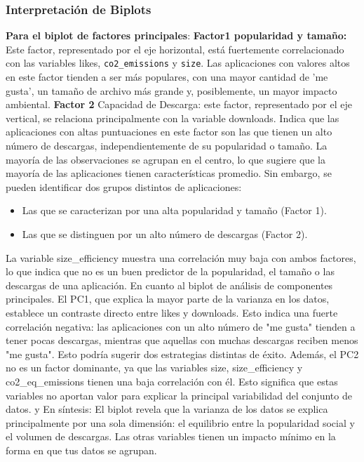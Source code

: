 \documentclass[journal]{IEEEtran}
\begin{document}
	\subsubsection{Interpretación de Biplots}
	\textbf{Para el biplot de factores principales}: \textbf{Factor1 popularidad y tamaño:} Este factor, representado por el eje horizontal, está fuertemente correlacionado con las variables likes, \texttt{co2\_emissions} y \texttt{size}. Las aplicaciones con valores altos en este factor tienden a ser más populares, con una mayor cantidad de 'me gusta', un tamaño de archivo más grande y, posiblemente, un mayor impacto ambiental.
	\textbf{Factor 2} Capacidad de Descarga: este factor, representado por el eje vertical, se relaciona principalmente con la variable downloads. Indica que las aplicaciones con altas puntuaciones en este factor son las que tienen un alto número de descargas, independientemente de su popularidad o tamaño.
	La mayoría de las observaciones se agrupan en el centro, lo que sugiere que la mayoría de las aplicaciones tienen características promedio. Sin embargo, se pueden identificar dos grupos distintos de aplicaciones:
	\begin{itemize}
		\item Las que se caracterizan por una alta popularidad y tamaño (Factor 1).
		\item Las que se distinguen por un alto número de descargas (Factor 2).
	\end{itemize}
	La variable size\_efficiency muestra una correlación muy baja con ambos factores, lo que indica que no es un buen predictor de la popularidad, el tamaño o las descargas de una aplicación.
	En cuanto al biplot de análisis de componentes principales. El PC1, que explica la mayor parte de la varianza en los datos, establece un contraste directo entre likes y downloads. Esto indica una fuerte correlación negativa: las aplicaciones con un alto número de "me gusta" tienden a tener pocas descargas, mientras que aquellas con muchas descargas reciben menos "me gusta". Esto podría sugerir dos estrategias distintas de éxito. Además, el PC2 no es un factor dominante, ya que las variables size, size\_efficiency y co2\_eq\_emissions tienen una baja correlación con él. Esto significa que estas variables no aportan valor para explicar la principal variabilidad del conjunto de datos. y En síntesis:
	El biplot revela que la varianza de los datos se explica principalmente por una sola dimensión: el equilibrio entre la popularidad social y el volumen de descargas. Las otras variables tienen un impacto mínimo en la forma en que tus datos se agrupan.
\end{document}
